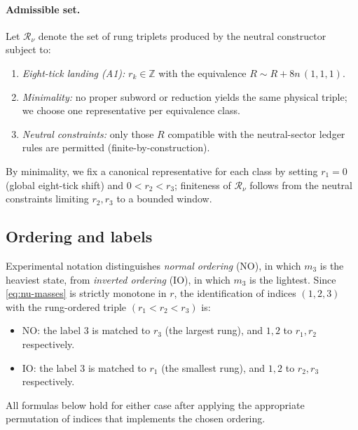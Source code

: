 \documentclass[11pt]{article}
\begin{document}
\paragraph{Admissible set.}
Let $\mathcal{R}_\nu$ denote the set of rung triplets produced by the neutral constructor subject to:
\begin{enumerate}
  \item \emph{Eight-tick landing (A1):} $r_k\in\mathbb{Z}$ with the equivalence $R\sim R+8n\,(1,1,1)$.
  \item \emph{Minimality:} no proper subword or reduction yields the same physical triple; we choose one representative per equivalence class.
  \item \emph{Neutral constraints:} only those $R$ compatible with the neutral-sector ledger rules are permitted (finite-by-construction).
\end{enumerate}
By minimality, we fix a canonical representative for each class by setting $r_1=0$ (global eight-tick shift) and $0<r_2<r_3$; finiteness of $\mathcal{R}_\nu$ follows from the neutral constraints limiting $r_2,r_3$ to a bounded window.

\subsection*{Ordering and labels}

Experimental notation distinguishes \emph{normal ordering} (NO), in which $m_3$ is the heaviest state, from \emph{inverted ordering} (IO), in which $m_3$ is the lightest. Since \eqref{eq:nu-masses} is strictly monotone in $r$, the identification of indices $(1,2,3)$ with the rung-ordered triple $(r_1<r_2<r_3)$ is:
\begin{itemize}
  \item NO: the label $3$ is matched to $r_3$ (the largest rung), and $1,2$ to $r_1,r_2$ respectively.
  \item IO: the label $3$ is matched to $r_1$ (the smallest rung), and $1,2$ to $r_2,r_3$ respectively.
\end{itemize}
All formulas below hold for either case after applying the appropriate permutation of indices that implements the chosen ordering.

\medskip
\setlength{\fboxrule}{0.6pt}
\setlength{\fboxsep}{8pt}
\end{document}
